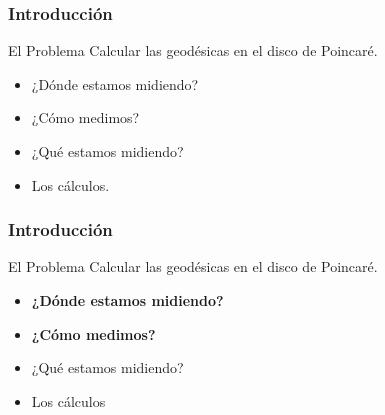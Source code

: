 \begin{frame}
\frametitle{Introducción}
  \begin{block}{El Problema}
    Calcular las geodésicas en el disco de Poincaré.
  \end{block}\pause

  \begin{itemize}
    \item ¿Dónde estamos midiendo? \pause
    \item ¿Cómo medimos? \pause
    \item ¿Qué estamos midiendo? \pause
    \item Los cálculos.
  \end{itemize}
  
\end{frame}

\begin{frame}
\frametitle{Introducción}
  \begin{block}{El Problema}
    Calcular las geodésicas en el disco de Poincaré.
  \end{block}

  \begin{itemize}
    \item \textbf{¿Dónde estamos midiendo?}
    \item \textbf{¿Cómo medimos?}
    \item ¿Qué estamos midiendo?
    \item Los cálculos
  \end{itemize}
\end{frame}
